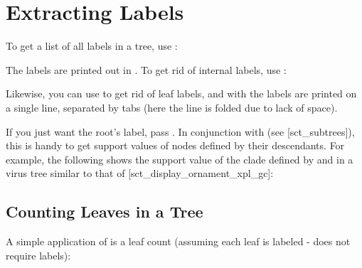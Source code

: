 
\section[sct_labels]{Extracting Labels}


To get a list of all labels in a tree, use :


The labels are printed out in \no. To get rid of internal labels,
use :


Likewise, you can use  to get rid of leaf labels, and
with  the labels are printed on a single line, separated by tabs
(here the line is folded due to lack of space).


If you just want the root's label, pass . In conjunction
with \clade{} (see \in{}[sct_subtrees]), this is handy to get support values of
nodes defined by their descendants. For example, the following shows the
support value of the clade defined by  and  in a
virus tree similar to that of \in{}[sct_display_ornament_xpl_gc]:


\subsection[sct_counting_leaves]{Counting Leaves in a Tree}

A simple application of  is a leaf count (assuming each leaf is
labeled - \nw{} does not require labels):


